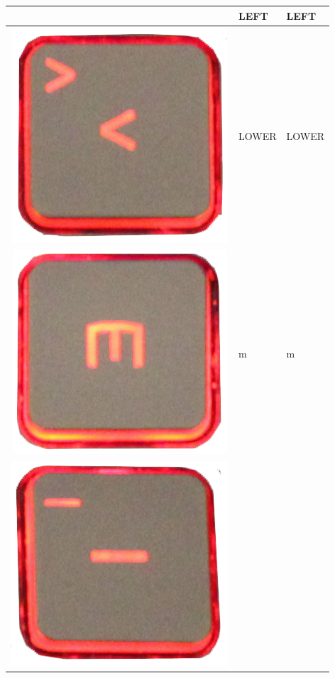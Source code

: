 \begin{longtable}{|cll|}
\begin{minipage}[c]{.3\textwidth}
\vspace{0.2cm}
\end{minipage} & LEFT & LEFT\\
\hline
\begin{minipage}[c]{.3\textwidth}
\vspace{0.2cm}
\includegraphics[scale=0.06]{Images/KeyMapping/LOWER}
\vspace{0.2cm}
\end{minipage} & LOWER & LOWER\\
\hline
\begin{minipage}[c]{.3\textwidth}
\vspace{0.2cm}
\includegraphics[scale=0.06]{Images/KeyMapping/m}
\vspace{0.2cm}
\end{minipage} & m & m\\
\hline
\begin{minipage}[c]{.3\textwidth}
\vspace{0.2cm}
\includegraphics[scale=0.06]{Images/KeyMapping/MINUS}

\end{minipage}
\end{longtable}

